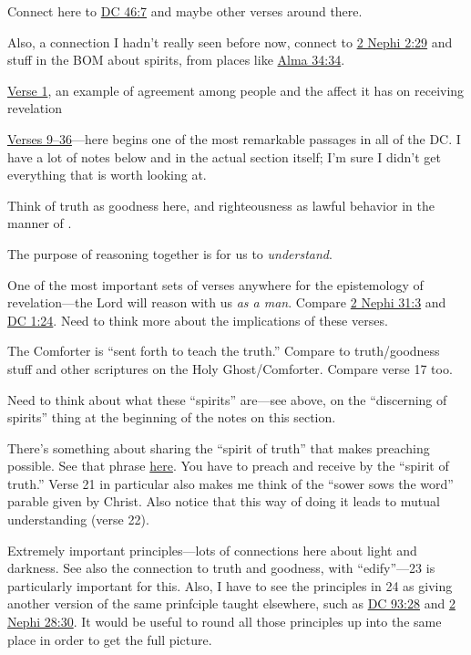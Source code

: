 \begin{compactdesc}
\begin{compactitem}
\begin{compactitem}
							\item Connect here to \hyperref[DC46-7]{DC 46:7} and maybe other verses around there.
							\item Also, a connection I hadn't really seen before now, connect to \hyperref[2NEPHI-2-29]{2 Nephi 2:29} and stuff in the BOM about spirits, from places like \hyperref[ALMA-34-34]{Alma 34:34}.
						\end{compactitem}
					\item \hyperref[DC50-1]{Verse 1}, an example of agreement among people and the affect it has on receiving revelation
					\item \hyperref[DC50-9]{Verses 9--36}---here begins one of the most remarkable passages in all of the DC. I have a lot of notes below and in the actual section itself; I'm sure I didn't get everything that is worth looking at.
						\begin{compactitem}
							\item[9] Think of truth as goodness here, and righteousness as lawful behavior in the manner of \hyperref[DIKAIOSUNE]{}.
							\item[10] The purpose of reasoning together is for us to \textit{understand}.
							\item[10--12] One of the most important sets of verses anywhere for the epistemology of revelation---the Lord will reason with us \textit{as a man}. Compare \hyperref[2NEPHI-31-3]{2 Nephi 31:3} and \hyperref[DC1-24]{DC 1:24}. Need to think more about the implications of these verses.
							\item[14] The Comforter is ``sent forth to teach the truth.'' Compare to truth/goodness stuff and other scriptures on the Holy Ghost/Comforter. Compare verse 17 too.
							\item[15] Need to think about what these ``spirits'' are---see above, on the ``discerning of spirits'' thing at the beginning of the notes on this section.
							\item[17--22] There's something about sharing the ``spirit of truth'' that makes preaching possible. See that phrase \hyperref[SPIRIT-PHRASES]{here}. You have to preach and receive by the ``spirit of truth.'' Verse 21 in particular also makes me think of the ``sower sows the word'' parable given by Christ. Also notice that this way of doing it leads to mutual understanding (verse 22).
							\item[22--24] Extremely important principles---lots of connections here about light and darkness. See also the connection to truth and goodness, with ``edify''---23 is particularly important for this. Also, I have to see the principles in 24 as giving another version of the same prinfciple taught elsewhere, such as \hyperref[DC93-28]{DC 93:28} and \hyperref[2NEPHI-28-30]{2 Nephi 28:30}. It would be useful to round all those principles up into the same place in order to get the full picture.

\end{compactitem}
\end{compactitem}
\end{compactdesc}
